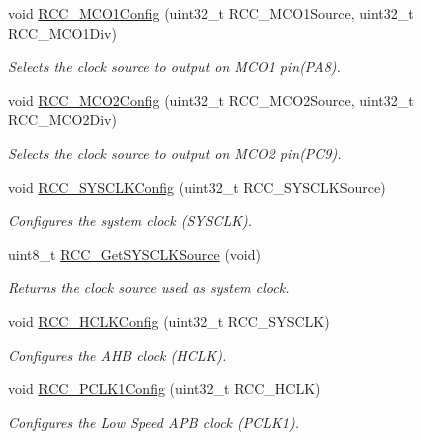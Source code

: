 \begin{DoxyCompactItemize}
void \hyperlink{group___r_c_c_ga15c9ecb6ef015ed008cb28e5b7a50531}{R\-C\-C\-\_\-\-M\-C\-O1\-Config} (uint32\-\_\-t R\-C\-C\-\_\-\-M\-C\-O1\-Source, uint32\-\_\-t R\-C\-C\-\_\-\-M\-C\-O1\-Div)
\begin{DoxyCompactList}\small\item\em Selects the clock source to output on M\-C\-O1 pin(\-P\-A8). \end{DoxyCompactList}\item 
void \hyperlink{group___r_c_c_gaf50f10675b747de60c739e44e5c22aee}{R\-C\-C\-\_\-\-M\-C\-O2\-Config} (uint32\-\_\-t R\-C\-C\-\_\-\-M\-C\-O2\-Source, uint32\-\_\-t R\-C\-C\-\_\-\-M\-C\-O2\-Div)
\begin{DoxyCompactList}\small\item\em Selects the clock source to output on M\-C\-O2 pin(\-P\-C9). \end{DoxyCompactList}\item 
void \hyperlink{group___r_c_c_ga3551a36a8f0a3dc96a74d6b939048337}{R\-C\-C\-\_\-\-S\-Y\-S\-C\-L\-K\-Config} (uint32\-\_\-t R\-C\-C\-\_\-\-S\-Y\-S\-C\-L\-K\-Source)
\begin{DoxyCompactList}\small\item\em Configures the system clock (S\-Y\-S\-C\-L\-K). \end{DoxyCompactList}\item 
uint8\-\_\-t \hyperlink{group___r_c_c_gaaeb32311c208b2a980841c9c884a41ea}{R\-C\-C\-\_\-\-Get\-S\-Y\-S\-C\-L\-K\-Source} (void)
\begin{DoxyCompactList}\small\item\em Returns the clock source used as system clock. \end{DoxyCompactList}\item 
void \hyperlink{group___r_c_c_ga9d0aec72e236c6cdf3a3a82dfb525491}{R\-C\-C\-\_\-\-H\-C\-L\-K\-Config} (uint32\-\_\-t R\-C\-C\-\_\-\-S\-Y\-S\-C\-L\-K)
\begin{DoxyCompactList}\small\item\em Configures the A\-H\-B clock (H\-C\-L\-K). \end{DoxyCompactList}\item 
void \hyperlink{group___r_c_c_ga448137346d4292985d4e7a61dd1a824f}{R\-C\-C\-\_\-\-P\-C\-L\-K1\-Config} (uint32\-\_\-t R\-C\-C\-\_\-\-H\-C\-L\-K)
\begin{DoxyCompactList}\small\item\em Configures the Low Speed A\-P\-B clock (P\-C\-L\-K1). \end{DoxyCompactList}\item 

\end{DoxyCompactItemize}
